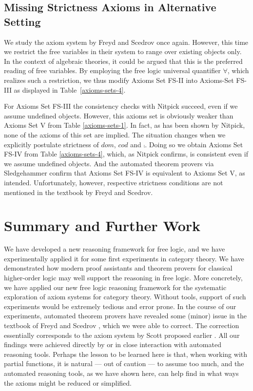 \subsection{Missing Strictness Axioms in Alternative
  Setting} \label{subsec-freyd-scedrov-2} We study the axiom system by
Freyd and Scedrov once again. However, this time we restrict the free
variables in their system to range over existing objects only. In the
context of algebraic theories, it could be argued that this is the
preferred reading of free variables.  By employing the free logic
universal quantifier $\forall$, which realizes such a restriction, 
we thus modify Axioms Set FS-II into
Axioms-Set FS-III as displayed in Table~\ref{axioms-sets-4}.  

For Axioms Set FS-III the consistency checks with Nitpick succeed,
even if we assume undefined objects. However, this axioms set is
obviously weaker than Axioms Set V from Table
\ref{axioms-sets-1}. In fact, as has been shown by Nitpick, none of
the axioms of this set are implied.  The situation changes when we
explicitly postulate strictness of $dom$, $cod$ and $\comp$. Doing
so we obtain Axioms Set FS-IV from Table \ref{axioms-sets-4}, which,
as Nitpick confirms, is consistent even if we assume undefined
objects. And the automated theorem provers via Sledgehammer confirm
that Axioms Set FS-IV is equivalent to Axioms Set V, as
intended. Unfortunately, however, respective strictness conditions are
not mentioned in the textbook by Freyd and Scedrov.





\section{Summary and Further Work}
We have developed a new reasoning framework for free logic, and we
have experimentally applied it for some first experiments in category
theory.  We have demonstrated how modern proof assistants and theorem
provers for classical higher-order logic may well support the
reasoning in free logic. More concretely, we have applied our new free
logic reasoning framework for the systematic exploration of axiom
systems for category theory. Without tools, support of such experiments
would be extremely tedious and error prone.
In the course of our experiments, automated theorem provers 
have revealed some (minor) issue in the textbook of Freyd and Scedrov \cite{FreydScedrov90},
which we were able to correct. The correction essentially corresponds
to the axiom system by Scott proposed earlier \cite{Scott67}.
All our findings were achieved directly by or in
close interaction with automated reasoning tools. 
Perhaps the lesson to be learned here is that, when working with partial functions,
it is natural --- out of caution  --- to assume too much, and the automated reasoning
tools, as we have shown here, can help find in what ways the axioms might be reduced or
simplified.

